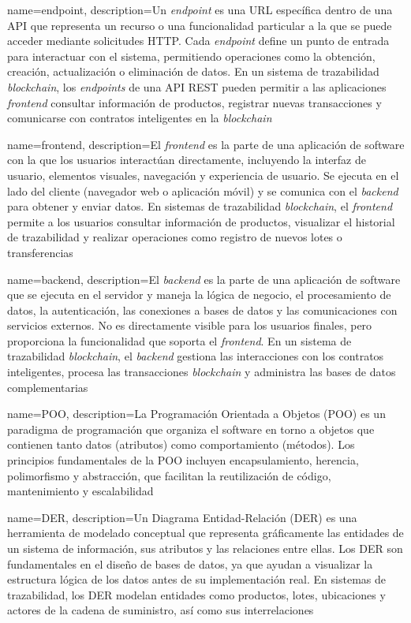 {
    name=endpoint,
    description={Un \textit{endpoint} es una URL específica dentro de una API que representa un recurso o una funcionalidad particular a la que se puede acceder mediante solicitudes HTTP. Cada \textit{endpoint} define un punto de entrada para interactuar con el sistema, permitiendo operaciones como la obtención, creación, actualización o eliminación de datos. En un sistema de trazabilidad \textit{blockchain}, los \textit{endpoints} de una API REST pueden permitir a las aplicaciones \textit{frontend} consultar información de productos, registrar nuevas transacciones y comunicarse con contratos inteligentes en la \textit{blockchain}}
}


{
    name=frontend,
    description={El \textit{frontend} es la parte de una aplicación de software con la que los usuarios interactúan directamente, incluyendo la interfaz de usuario, elementos visuales, navegación y experiencia de usuario. Se ejecuta en el lado del cliente (navegador web o aplicación móvil) y se comunica con el \textit{backend} para obtener y enviar datos. En sistemas de trazabilidad \textit{blockchain}, el \textit{frontend} permite a los usuarios consultar información de productos, visualizar el historial de trazabilidad y realizar operaciones como registro de nuevos lotes o transferencias}
}

{
    name=backend,
    description={El \textit{backend} es la parte de una aplicación de software que se ejecuta en el servidor y maneja la lógica de negocio, el procesamiento de datos, la autenticación, las conexiones a bases de datos y las comunicaciones con servicios externos. No es directamente visible para los usuarios finales, pero proporciona la funcionalidad que soporta el \textit{frontend}. En un sistema de trazabilidad \textit{blockchain}, el \textit{backend} gestiona las interacciones con los contratos inteligentes, procesa las transacciones \textit{blockchain} y administra las bases de datos complementarias}
}

{
    name=POO,
    description={La Programación Orientada a Objetos (POO) es un paradigma de programación que organiza el software en torno a objetos que contienen tanto datos (atributos) como comportamiento (métodos). Los principios fundamentales de la POO incluyen encapsulamiento, herencia, polimorfismo y abstracción, que facilitan la reutilización de código, mantenimiento y escalabilidad}
}

{
    name=DER,
    description={Un Diagrama Entidad-Relación (DER) es una herramienta de modelado conceptual que representa gráficamente las entidades de un sistema de información, sus atributos y las relaciones entre ellas. Los DER son fundamentales en el diseño de bases de datos, ya que ayudan a visualizar la estructura lógica de los datos antes de su implementación real. En sistemas de trazabilidad, los DER modelan entidades como productos, lotes, ubicaciones y actores de la cadena de suministro, así como sus interrelaciones}
}

